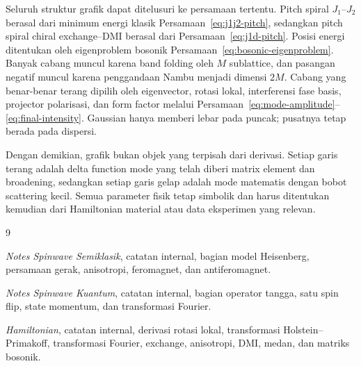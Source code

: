 \documentclass[11pt,a4paper]{article}
\begin{document}
Seluruh struktur grafik dapat ditelusuri ke persamaan tertentu. Pitch spiral $J_1$--$J_2$ berasal dari minimum energi klasik Persamaan~\eqref{eq:j1j2-pitch}, sedangkan pitch spiral chiral exchange--DMI berasal dari Persamaan~\eqref{eq:j1d-pitch}. Posisi energi ditentukan oleh eigenproblem bosonik Persamaan~\eqref{eq:bosonic-eigenproblem}. Banyak cabang muncul karena band folding oleh $M$ sublattice, dan pasangan negatif muncul karena penggandaan Nambu menjadi dimensi $2M$. Cabang yang benar-benar terang dipilih oleh eigenvector, rotasi lokal, interferensi fase basis, projector polarisasi, dan form factor melalui Persamaan~\eqref{eq:mode-amplitude}--\eqref{eq:final-intensity}. Gaussian hanya memberi lebar pada puncak; pusatnya tetap berada pada dispersi.

Dengan demikian, grafik bukan objek yang terpisah dari derivasi. Setiap garis terang adalah delta function mode yang telah diberi matrix element dan broadening, sedangkan setiap garis gelap adalah mode matematis dengan bobot scattering kecil. Semua parameter fisik tetap simbolik dan harus ditentukan kemudian dari Hamiltonian material atau data eksperimen yang relevan.

\begin{thebibliography}{9}

\emph{Notes Spinwave Semiklasik}, catatan internal, bagian model Heisenberg, persamaan gerak, anisotropi, feromagnet, dan antiferomagnet.

\emph{Notes Spinwave Kuantum}, catatan internal, bagian operator tangga, satu spin flip, state momentum, dan transformasi Fourier.

\emph{Hamiltonian}, catatan internal, derivasi rotasi lokal, transformasi Holstein--Primakoff, transformasi Fourier, exchange, anisotropi, DMI, medan, dan matriks bosonik.

\end{thebibliography}
\end{document}
